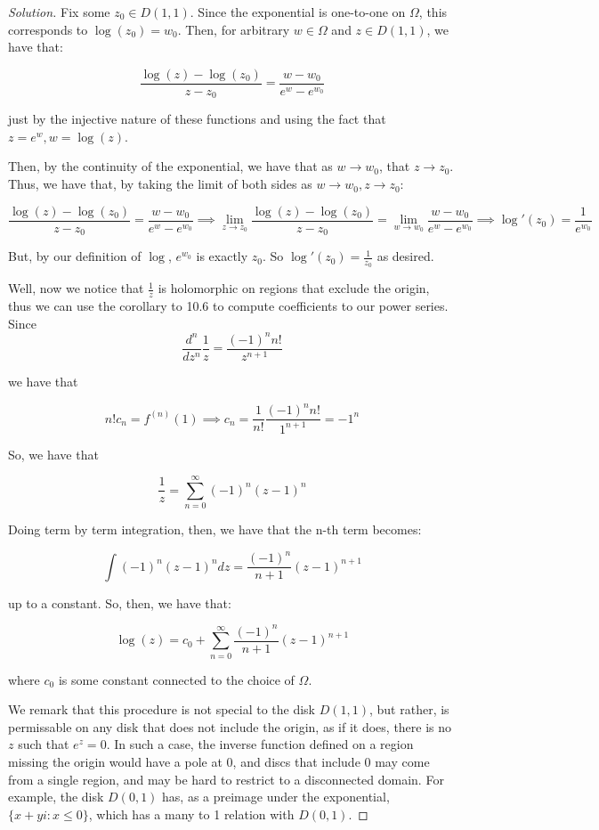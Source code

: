 \documentclass[10pt]{article}
\begin{document}
\begin{proof}[Solution]

Fix some $z_0 \in D(1,1)$. Since the exponential is one-to-one on $\Omega$, this corresponds to $\log(z_0) = w_0$. Then, for arbitrary $w \in \Omega$ and $z \in D(1,1)$, we have that:


$$ \frac{\log(z) - \log(z_0)}{z - z_0} = \frac{ w - w_0}{e^w - e^{w_0}} $$

just by the injective nature of these functions and using the fact that $z = e^w, w = \log(z)$.

Then, by the continuity of the exponential, we have that as $w \to w_0$, that $z \to z_0$. Thus, we have that, by taking the limit of both sides as $w \to w_0, z \to z_0$:

$$ \frac{\log(z) - \log(z_0)}{z - z_0} = \frac{ w - w_0}{e^w - e^{w_0}} \implies \lim_{z\to z_0} \frac{\log(z) - \log(z_0)}{z - z_0} = \lim_{w\to w_0} \frac{ w - w_0}{e^w - e^{w_0}} \implies \log'(z_0) = \frac{1}{e^{w_0}}$$

But, by our definition of $\log$, $e^{w_0}$ is exactly $z_0$. So $\log'(z_0) = \frac{1}{z_0}$ as desired. 

Well, now we notice that $\frac{1}{z}$ is holomorphic on regions that exclude the origin, thus we can use the corollary to 10.6 to compute coefficients to our power series. Since $$\frac{d^n}{dz^n}\frac{1}{z} = \frac{(-1)^n n!}{ z^{n+1}}$$

we have that

$$n! c_n = f^{(n)}(1) \implies c_n = \frac{1}{n!}\frac{(-1)^n n!}{ 1^{n+1}} = -1^n$$

So, we have that

$$ \frac{1}{z} = \sum_{n=0}^\infty (-1)^n(z-1)^n$$

Doing term by term integration, then, we have that the n-th term becomes:

$$\int (-1)^n(z-1)^n dz = \frac{(-1)^n}{n+1}(z-1)^{n+1} $$

up to a constant. So, then, we have that:

$$\log(z) = c_0 + \sum_{n=0}^\infty \frac{(-1)^n}{n+1}(z-1)^{n+1}$$

where $c_0$ is some constant connected to the choice of $\Omega$.

We remark that this procedure is not special to the disk $D(1,1)$, but rather, is permissable on any disk that does not include the origin, as if it does, there is no $z$ such that $e^z = 0$. In such a case, the inverse function defined on a region missing the origin would have a pole at $0$, and discs that include $0$ may come from a single region, and may be hard to restrict to a disconnected domain. For example, the disk $D(0,1)$ has, as a preimage under the exponential, $\{ x + yi : x \leq 0 \}$, which has a many to 1 relation with $D(0,1)$.

\end{proof}
\end{document}
